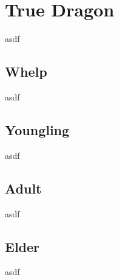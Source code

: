 \section{True Dragon}

asdf

\subsection{Whelp}

asdf

\subsection{Youngling}

asdf

\subsection{Adult}

asdf

\subsection{Elder}

asdf